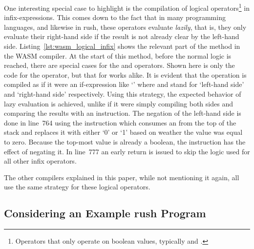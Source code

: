 One interesting special case to highlight is the compilation of logical operators\footnote{Operators that only operate on boolean values, typically \qVerb{&&} and \qVerb{||}.} in infix-expressions.
This comes down to the fact that in many programming languages, and likewise in rush, these operators evaluate \emph{lazily}, that is, they only evaluate their right-hand side if the result is not already clear by the left-hand side.
Listing~\ref{lst:wasm_logical_infix} shows the relevant part of the  method in the WASM compiler.
At the start of this method, before the normal logic is reached, there are special cases for the \qVerb{&&} and \qVerb{||} operators.
Shown here is only the code for the \qVerb{&&} operator, but that for \qVerb{||} works alike.
It is evident that the operation is compiled as if it were an if-expression like `' where  and  stand for `left-hand side' and `right-hand side' respectively.
Using this strategy, the expected behavior of lazy evaluation is achieved, unlike if it were simply compiling both sides and comparing the results with an  instruction.
The negation of the left-hand side is done in line~764 using the  instruction which consumes an  from the top of the stack and replaces it with either `0' or `1' based on weather the value was equal to zero.
Because the top-most value is already a boolean, the instruction has the effect of negating it.
In line~777 an early return is issued to skip the logic used for all other infix operators.

The other compilers explained in this paper, while not mentioning it again, all use the same strategy for these logical operators.

\subsection{Considering an Example rush Program}


